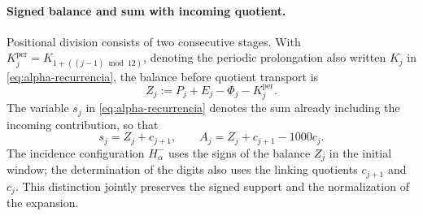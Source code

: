 \paragraph{Signed balance and sum with incoming quotient.}
\label{ampl-alfa-z-s-aclaracion}
Positional division consists of two consecutive stages. With
\(K_j^{\mathrm{per}}=K_{1+((j-1)\bmod12)}\), denoting the
periodic prolongation also written \(K_j\) in
\eqref{eq:alpha-recurrencia}, the balance before quotient
transport is
\[
 Z_j:=P_j+E_j-\Phi_j-K_j^{\mathrm{per}}.
\]
The variable $s_j$ in \eqref{eq:alpha-recurrencia} denotes the sum already
including the incoming contribution, so that
\[
 s_j=Z_j+c_{j+1},\qquad
 A_j=Z_j+c_{j+1}-1000c_j.
\]
The incidence configuration
$H^-_\alpha$ uses the signs of the balance $Z_j$ in the initial window;
the determination of the digits also uses the linking quotients
$c_{j+1}$ and $c_j$. This distinction jointly preserves the signed
support and the normalization of the expansion.
